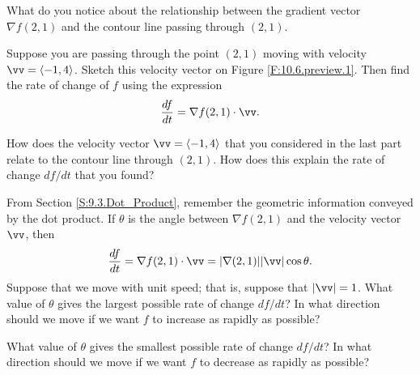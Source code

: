 \begin{pa}
  \item What do you notice about the relationship between the gradient
    vector $\nabla f(2,1)$ and the contour line passing
    through $(2,1)$.

  \item Suppose you are passing through the point $(2,1)$ moving with
    velocity $\vv =\langle -1,4\rangle$.  Sketch this velocity vector
    on Figure \ref{F:10.6.preview.1}.  Then find the rate of change of
    $f$ using the expression
    $$
    \frac{df}{dt} = \nabla f(2,1)\cdot\vv.
    $$
  \item How does the velocity vector $\vv=\langle -1,4\rangle$ that
    you considered in the last part relate to the contour line through
    $(2,1)$.  How does this explain the rate of change $df/dt$ that
    you found?

  \item From Section \ref{S:9.3.Dot_Product}, remember the geometric
    information  conveyed by the dot product.  If $\theta$ is the
    angle between $\nabla f(2,1)$ and the velocity vector $\vv$, then
    $$
    \frac{df}{dt} = \nabla f(2,1)\cdot\vv =
    |\nabla(2,1)||\vv|\cos\theta.
    $$
    Suppose that we move with unit speed;  that is, suppose that
    $|\vv| = 1$.  What value of $\theta$ gives the largest possible
    rate of change $df/dt$?  In what direction should we move if we
    want $f$ to increase as rapidly as possible?
  \item What value of $\theta$ gives the smallest possible rate of
    change $df/dt$?  In what direction should we move if we want $f$
    to decrease as rapidly as possible?
 \ea

\end{pa} \afterpa 
